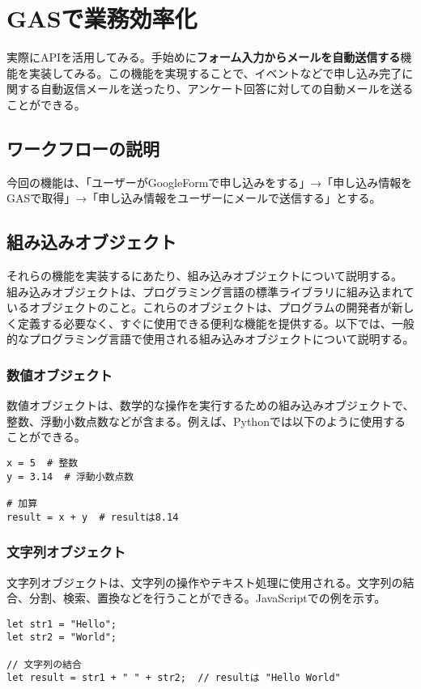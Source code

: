 \documentclass{jsarticle}
\begin{document}
\section{GASで業務効率化}
実際にAPIを活用してみる。手始めに{\bf フォーム入力からメールを自動送信する}機能を実装してみる。この機能を実現することで、イベントなどで申し込み完了に関する自動返信メールを送ったり、アンケート回答に対しての自動メールを送ることができる。
\subsection{ワークフローの説明}
今回の機能は、「ユーザーがGoogleFormで申し込みをする」→「申し込み情報をGASで取得」→「申し込み情報をユーザーにメールで送信する」とする。
\subsection{組み込みオブジェクト}
それらの機能を実装するにあたり、組み込みオブジェクトについて説明する。
組み込みオブジェクトは、プログラミング言語の標準ライブラリに組み込まれているオブジェクトのこと。これらのオブジェクトは、プログラムの開発者が新しく定義する必要なく、すぐに使用できる便利な機能を提供する。以下では、一般的なプログラミング言語で使用される組み込みオブジェクトについて説明する。

\subsubsection{数値オブジェクト}
数値オブジェクトは、数学的な操作を実行するための組み込みオブジェクトで、整数、浮動小数点数などが含まる。例えば、Pythonでは以下のように使用することができる。

\begin{verbatim}
x = 5  # 整数
y = 3.14  # 浮動小数点数

# 加算
result = x + y  # resultは8.14
\end{verbatim}

\subsubsection{文字列オブジェクト}
文字列オブジェクトは、文字列の操作やテキスト処理に使用される。文字列の結合、分割、検索、置換などを行うことができる。JavaScriptでの例を示す。

\begin{verbatim}
let str1 = "Hello";
let str2 = "World";

// 文字列の結合
let result = str1 + " " + str2;  // resultは "Hello World"
\end{verbatim}
\end{document}
